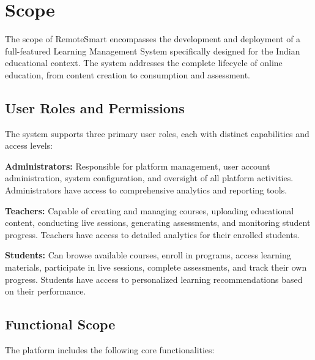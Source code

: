 \documentclass[12pt,a4paper]{report}
\begin{document}
\section{Scope}

The scope of RemoteSmart encompasses the development and deployment of a full-featured Learning Management System specifically designed for the Indian educational context. The system addresses the complete lifecycle of online education, from content creation to consumption and assessment.

\subsection{User Roles and Permissions}

The system supports three primary user roles, each with distinct capabilities and access levels:

\textbf{Administrators:} Responsible for platform management, user account administration, system configuration, and oversight of all platform activities. Administrators have access to comprehensive analytics and reporting tools.

\textbf{Teachers:} Capable of creating and managing courses, uploading educational content, conducting live sessions, generating assessments, and monitoring student progress. Teachers have access to detailed analytics for their enrolled students.

\textbf{Students:} Can browse available courses, enroll in programs, access learning materials, participate in live sessions, complete assessments, and track their own progress. Students have access to personalized learning recommendations based on their performance.

\subsection{Functional Scope}

The platform includes the following core functionalities:
\end{document}
